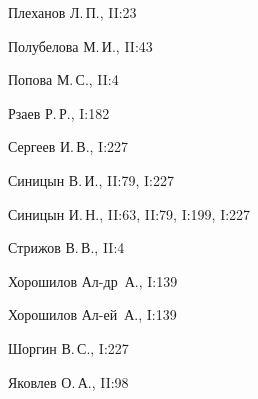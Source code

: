 \begin{theindex}
  \item Плеханов Л.\,П., II:23


  \item Полубелова М.\,И., II:43


  \item Попова М.\,С., II:4





  \indexspace





  \item Рзаев Р.\,Р., I:182





  \indexspace





  \item Сергеев И.\,В., I:227


  \item Синицын В.\,И., II:79, I:227


  \item Синицын И.\,Н., II:63, II:79, I:199, I:227


  \item Стрижов В.\,В., II:4





  \indexspace





  \item Хорошилов  Ал-др~А., I:139


  \item Хорошилов Ал-ей~А., I:139





  \indexspace





  \item Шоргин В.\,С., I:227





  \indexspace





  \item Яковлев О.\,А., II:98





\end{theindex}


